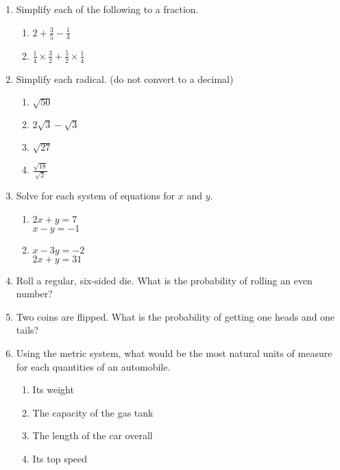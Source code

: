 \documentclass[12pt, twoside]{article}
\begin{document}
\begin{enumerate}[itemsep=0.75cm]
  \item Simplify each of the following to a fraction.
  \begin{multicols}{2}
  \begin{enumerate}[itemsep=4cm]
    \item $\displaystyle 2+\frac{3}{5}-\frac{1}{4}$ 
    \item $\displaystyle \frac{1}{4} \times \frac{3}{2} + \frac{5}{2} \times \frac{1}{4}$
  \end{enumerate}
  \end{multicols}\vspace{3cm}

\item Simplify each radical. (do not convert to a decimal)
  \begin{multicols}{2}
    \begin{enumerate}[itemsep=2cm]
      \item $\sqrt{50}$ 
      \item $2\sqrt{3} - \sqrt{3}$
      \item $\sqrt{27}$ 
      \item $\displaystyle \frac{\sqrt{18}}{\sqrt{2}}$ 
    \end{enumerate}
    \end{multicols}\vspace{2cm}
  
\newpage
\item Solve for each system of equations for $x$ and $y$.
\begin{multicols}{2}
  \begin{enumerate}
    \item $2x+y=7$ \\
    $x -y =-1$
    \item $x-3y=-2$ \\
    $2x+y =31$
  \end{enumerate}
\end{multicols} \vspace{7cm}

\item Roll a regular, six-sided die. What is the probability of rolling an even number?
\vspace{1cm}
\item Two coins are flipped. What is the probability of getting one heads and one tails?
\vspace{1cm}
\item Using the metric system, what would be the most natural units of measure for each quantities of an automobile.
\begin{enumerate}[itemsep=1cm]
  \item Its weight
  \item The capacity of the gas tank
  \item The length of the car overall
  \item Its top speed
\end{enumerate}
    

\end{enumerate}
\end{document}
